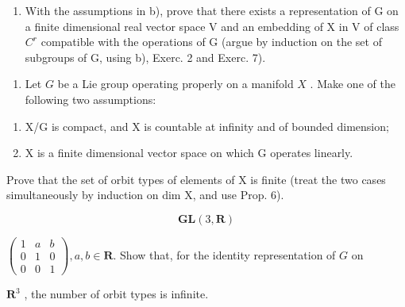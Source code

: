\begin{enumerate}
\begin{enumerate}
\def\labelenumi{\alph{enumi})}
\setcounter{enumi}{2}
\tightlist
\item
  With the assumptions in b), prove that there exists a representation of G on a finite dimensional real vector space V and an embedding of X in V of class \(C^{r}\) compatible with the operations of G (argue by induction on the set of subgroups of G, using b), Exerc. 2 and Exerc. 7).
\end{enumerate}

\begin{enumerate}
\def\labelenumi{\arabic{enumi})}
\setcounter{enumi}{8}
\tightlist
\item
  Let \(G\) be a Lie group operating properly on a manifold \(X\) . Make one of the following two assumptions:
\end{enumerate}

\begin{enumerate}
\def\labelenumi{(\roman{enumi})}
\tightlist
\item
  X/G is compact, and X is countable at infinity and of bounded dimension;\\
\item
  X is a finite dimensional vector space on which G operates linearly.
\end{enumerate}

Prove that the set of orbit types of elements of X is finite (treat the two cases simultaneously by induction on dim X, and use Prop. 6).

\[
\mathbf {G L} (3, \mathbf {R})
\]

\(\left(\begin{array}{ccc}1 & a & b \\ 0 & 1 & 0 \\ 0 & 0 & 1\end{array}\right), a, b \in \mathbf{R}.\) Show that, for the identity representation of \(G\) on

\(\mathbf{R}^3\) , the number of orbit types is infinite.

\end{enumerate}
